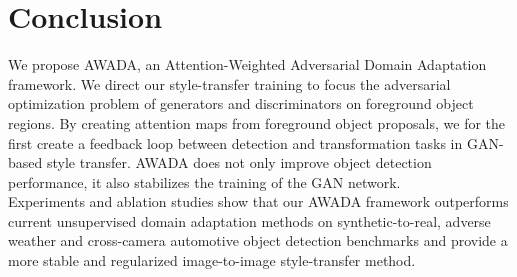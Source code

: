 \documentclass[10pt,twocolumn,letterpaper]{article}
\begin{document}
\section{Conclusion}

We propose AWADA, an Attention-Weighted Adversarial Domain Adaptation framework. We direct our style-transfer training to focus the adversarial optimization problem of generators and discriminators on foreground object regions. By creating attention maps from foreground object proposals, we for the first create a feedback loop between detection and transformation tasks in GAN-based style transfer. AWADA does not only improve object detection performance, it also stabilizes the training of the GAN network. \\
Experiments and ablation studies show that our AWADA framework outperforms current unsupervised domain adaptation methods on synthetic-to-real, adverse weather and cross-camera automotive object detection benchmarks and provide a more stable and regularized image-to-image style-transfer method.

{\small


}
\end{document}
